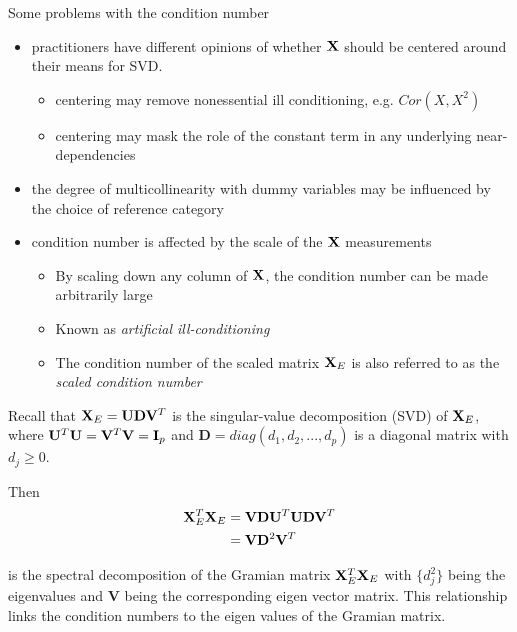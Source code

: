 Some problems with the condition number
\begin{itemize}
	\item practitioners have different opinions of whether $\mathbf{X}$ should be centered around their means for SVD. 
	\begin{itemize}
		\item centering may remove nonessential ill conditioning, e.g. $Cor(X, X^2)$
		\item centering may mask the role of the constant term in any underlying near-dependencies
	\end{itemize}
	\item the degree of multicollinearity with dummy variables may be influenced by the choice of reference category
	\item condition number is affected by the scale of the $\mathbf{X}$ measurements
	\begin{itemize}
		\item By scaling down any column of $\mathbf{X}$, the condition number can be made arbitrarily large
		\item Known as {\it artificial ill-conditioning}
		\item The condition number of the scaled matrix $\mathbf{X}_E$ is also referred to as the {\it scaled condition number}
	\end{itemize}
\end{itemize}

Recall that $\mathbf{X}_E=\mathbf{U}\mathbf{D}\mathbf{V}^T$ is the singular-value decomposition (SVD) of $\mathbf{X}_E$,
where $\mathbf{U}^T \mathbf{U} = \mathbf{V}^T \mathbf{V} = \mathbf{I}_p$
and $\mathbf{D} = diag(d_1, d_2, ..., d_p)$ is a diagonal matrix with $d_j \ge 0$.

\vspace{2em}
Then
\vspace{1em}
\begin{equation*}
	\begin{aligned}
		\mathbf{X}_E^T \mathbf{X}_E &= \mathbf{V}\mathbf{D}\mathbf{U}^T\mathbf{U}\mathbf{D}\mathbf{V}
		^T \\
		&= \mathbf{V}\mathbf{D}^2 \mathbf{V}^T\\
	\end{aligned}
\end{equation*}
\vspace{1em}

is the spectral decomposition of the Gramian matrix $\mathbf{X}_E^T \mathbf{X}_E$ with $\{d_j^2\}$ being the eigenvalues and $\mathbf{V}$ being the corresponding eigen vector matrix.
This relationship links the condition numbers to the eigen values of the Gramian matrix.

